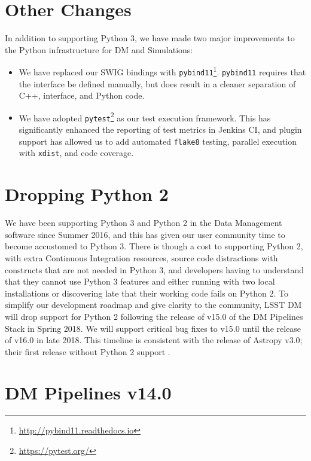 \documentclass[11pt,twoside]{article}
\begin{document}
\section{Other Changes}


In addition to supporting Python 3, we have made two major improvements to the Python infrastructure for DM and Simulations:
\begin{itemize}
\item We have replaced our SWIG bindings \citep{beazley2003automated} with \texttt{pybind11}\footnote{\url{http://pybind11.readthedocs.io}}.
      \texttt{pybind11} requires that the interface be defined manually, but does result in a cleaner separation of C++, interface, and Python code.
\item We have adopted \texttt{pytest}\footnote{\url{https://pytest.org/}} as our test execution framework.
      This has significantly enhanced the reporting of test metrics in Jenkins CI, and plugin support has allowed us to add automated \texttt{flake8} testing, parallel execution with \texttt{xdist}, and code coverage.
\end{itemize}

\section{Dropping Python 2}

We have been supporting Python 3 and Python 2 in the Data Management software since Summer 2016, and this has given our user community time to become accustomed to Python 3.
There is though a cost to supporting Python 2, with extra Continuous Integration resources, source code distractions with constructs that are not needed in Python 3, and developers having to understand that they cannot use Python 3 features and either running with two local installations or discovering late that their working code fails on Python 2.
To simplify our development roadmap and give clarity to the community, LSST DM will drop support for Python 2 following the release of v15.0 of the DM  Pipelines Stack in Spring 2018.
We will support critical bug fixes to v15.0 until the release of v16.0 in late 2018. This timeline is consistent with the release of Astropy v3.0; their first release without Python 2 support \citep{APE10}.

\section{DM Pipelines v14.0}
\end{document}
